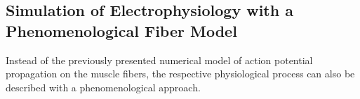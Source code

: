 % 
% 
% 
% 
% 
% 


\subsection{Simulation of Electrophysiology with a Phenomenological Fiber Model}\label{sec:sim_rosenfalck}

Instead of the previously presented numerical model of action potential propagation on the muscle fibers, the respective physiological process can also be described with a phenomenological approach.

